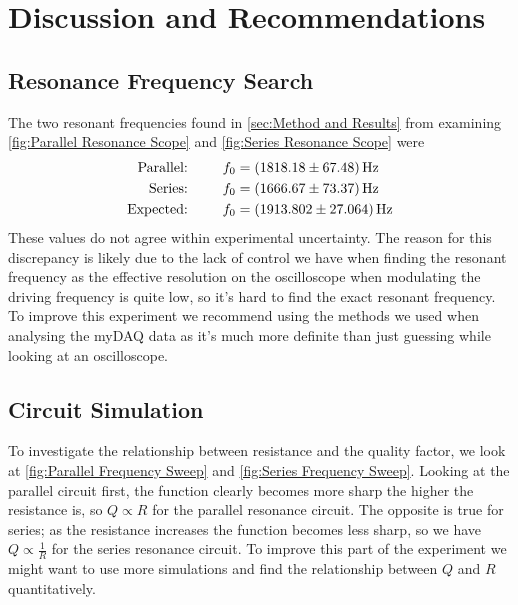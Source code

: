 \documentclass[12pt]{article}
\numberwithin{equation}{section}
\numberwithin{figure}{section}
\begin{document}
    \section{Discussion and Recommendations}\label{sec:Discussion and Recommendations}
    \subsection{Resonance Frequency Search}\label{sec:Resonance Frequency Search}
    The two resonant frequencies found in \autoref{sec:Method and Results} from examining 
    \autoref{fig:Parallel Resonance Scope} and \autoref{fig:Series Resonance Scope} were 
    \begin{align*}
        \text{Parallel:}&\hspace{25pt}f_0=\SI{1818.18\pm67.48}{\hertz}\\
        \text{Series:}&\hspace{25pt}f_0=\SI{1666.67\pm73.37}{\hertz}\\
        \text{Expected:}&\hspace{25pt}f_0=\SI{1913.802\pm27.064}{\hertz}
    \end{align*}
    These values do not agree within experimental uncertainty. The reason for this discrepancy is likely due to the lack of control 
    we have when finding the resonant frequency as the effective resolution on the oscilloscope when 
    modulating the driving frequency is quite low, so it's hard to find the exact resonant frequency. 
    To improve this experiment we recommend using the methods we used when analysing the myDAQ data as 
    it's much more definite than just guessing while looking at an oscilloscope. 

    \subsection{Circuit Simulation}\label{sec:Circuit Simulation}
    To investigate the relationship between resistance and the quality factor, we look at 
    \autoref{fig:Parallel Frequency Sweep} and \autoref{fig:Series Frequency Sweep}. Looking at the 
    parallel circuit first, the function clearly becomes more sharp the higher the resistance is, so 
    $Q\propto R$ for the parallel resonance circuit. The opposite is true for series; as the resistance 
    increases the function becomes less sharp, so we have $Q\propto \frac{1}{R}$ for the series 
    resonance circuit. To improve this part of the experiment we might want to use more simulations 
    and find the relationship between $Q$ and $R$ quantitatively. 
\end{document}
